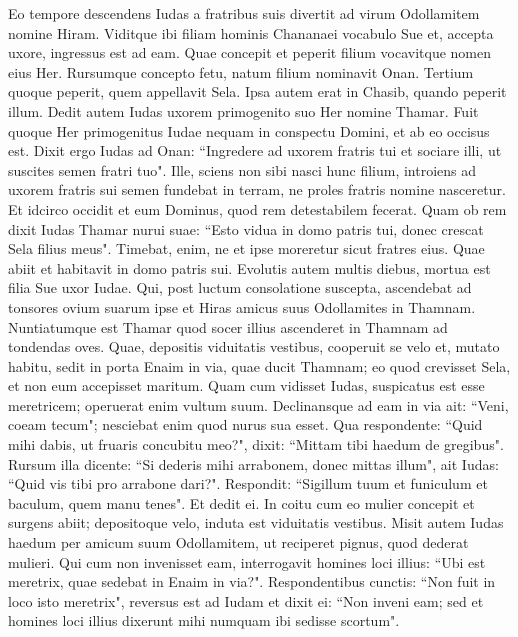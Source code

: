\begin{biblechapter}  
\verse Eo tempore descendens Iudas a fratribus suis divertit ad virum Odollamitem nomine Hiram. 
\verse Viditque ibi filiam hominis Chananaei vocabulo Sue et, accepta uxore, ingressus est ad eam. 
\verse Quae concepit et peperit filium vocavitque nomen eius Her. 
\verse Rursumque concepto fetu, natum filium nominavit Onan. 
\verse Tertium quoque peperit, quem appellavit Sela. Ipsa autem erat in Chasib, quando peperit illum. 
\verse Dedit autem Iudas uxorem primogenito suo Her nomine Thamar. 
\verse Fuit quoque Her primogenitus Iudae nequam in conspectu Domini, et ab eo occisus est. 
\verse Dixit ergo Iudas ad Onan: “Ingredere ad uxorem fratris tui et sociare illi, ut suscites semen fratri tuo". 
\verse Ille, sciens non sibi nasci hunc filium, introiens ad uxorem fratris sui semen fundebat in terram, ne proles fratris nomine nasceretur. 
\verse Et idcirco occidit et eum Dominus, quod rem detestabilem fecerat. 
\verse Quam ob rem dixit Iudas Thamar nurui suae: “Esto vidua in domo patris tui, donec crescat Sela filius meus". Timebat, enim, ne et ipse moreretur sicut fratres eius. Quae abiit et habitavit in domo patris sui. 
\verse Evolutis autem multis diebus, mortua est filia Sue uxor Iudae. Qui, post luctum consolatione suscepta, ascendebat ad tonsores ovium suarum ipse et Hiras amicus suus Odollamites in Thamnam. 
\verse Nuntiatumque est Thamar quod socer illius ascenderet in Thamnam ad tondendas oves. 
\verse Quae, depositis viduitatis vestibus, cooperuit se velo et, mutato habitu, sedit in porta Enaim in via, quae ducit Thamnam; eo quod crevisset Sela, et non eum accepisset maritum. 
\verse Quam cum vidisset Iudas, suspicatus est esse meretricem; operuerat enim vultum suum. 
\verse Declinansque ad eam in via ait: “Veni, coeam tecum"; nesciebat enim quod nurus sua esset. Qua respondente: “Quid mihi dabis, ut fruaris concubitu meo?", 
\verse dixit: “Mittam tibi haedum de gregibus". Rursum illa dicente: “Si dederis mihi arrabonem, donec mittas illum", 
\verse ait Iudas: “Quid vis tibi pro arrabone dari?". Respondit: “Sigillum tuum et funiculum et baculum, quem manu tenes". Et dedit ei. In coitu cum eo mulier concepit 
\verse et surgens abiit; depositoque velo, induta est viduitatis vestibus. 
\verse Misit autem Iudas haedum per amicum suum Odollamitem, ut reciperet pignus, quod dederat mulieri. Qui cum non invenisset eam, 
\verse interrogavit homines loci illius: “Ubi est meretrix, quae sedebat in Enaim in via?". Respondentibus cunctis: “Non fuit in loco isto meretrix", 
\verse reversus est ad Iudam et dixit ei: “Non inveni eam; sed et homines loci illius dixerunt mihi numquam ibi sedisse scortum". 

\end{biblechapter}

